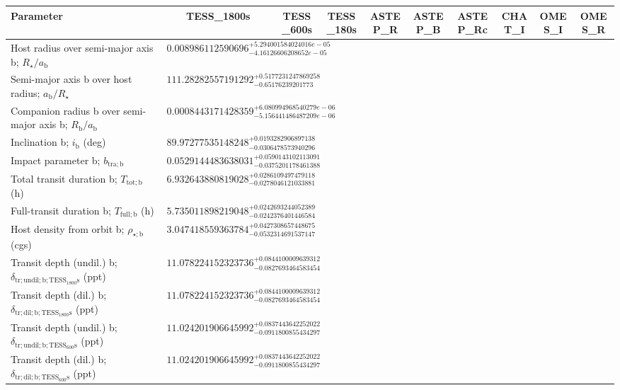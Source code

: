 \begin{table}[h]
\centering
\begin{tabular}{|l|c|c|c|c|c|c|c|c|c|}
\hline
\textbf{Parameter} & \textbf{TESS_1800s} & \textbf{TESS_600s} & \textbf{TESS_180s} & \textbf{ASTEP_R} & \textbf{ASTEP_B} & \textbf{ASTEP_Rc} & \textbf{CHAT_I} & \textbf{OMES_I} & \textbf{OMES_R} \\
\hline
Host radius over semi-major axis b; $R_\star/a_\mathrm{b}$ & \( 0.008986112590696^{+5.294001584024016e-05}_{-4.16126606208652e-05} \) & & & & & & & & \\
Semi-major axis b over host radius; $a_\mathrm{b}/R_\star$ & \( 111.28282557191292^{+0.5177231247869258}_{-0.65176239201773} \) & & & & & & & & \\
Companion radius b over semi-major axis b; $R_\mathrm{b}/a_\mathrm{b}$ & \( 0.0008443171428359^{+6.080994968540279e-06}_{-5.156441486487209e-06} \) & & & & & & & & \\
Inclination b; $i_\mathrm{b}$ (deg) & \( 89.97277535148248^{+0.0193282906897138}_{-0.0306478573940296} \) & & & & & & & & \\
Impact parameter b; $b_\mathrm{tra;b}$ & \( 0.0529144483638031^{+0.0590143102113091}_{-0.0375201178461388} \) & & & & & & & & \\
Total transit duration b; $T_\mathrm{tot;b}$ (h) & \( 6.932643880819028^{+0.0286109497479118}_{-0.0278046121033881} \) & & & & & & & & \\
Full-transit duration b; $T_\mathrm{full;b}$ (h) & \( 5.735011898219048^{+0.0242693244052389}_{-0.0242376401446584} \) & & & & & & & & \\
Host density from orbit b; $\rho_\mathrm{\star;b}$ (cgs) & \( 3.047418559363784^{+0.0427308657448675}_{-0.0532314691537147} \) & & & & & & & & \\
Transit depth (undil.) b; $\delta_\mathrm{tr; undil; b; TESS_1800s}$ (ppt) & \( 11.078224152323736^{+0.0844100009639312}_{-0.0827693464583454} \) & & & & & & & & \\
Transit depth (dil.) b; $\delta_\mathrm{tr; dil; b; TESS_1800s}$ (ppt) & \( 11.078224152323736^{+0.0844100009639312}_{-0.0827693464583454} \) & & & & & & & & \\
Transit depth (undil.) b; $\delta_\mathrm{tr; undil; b; TESS_600s}$ (ppt) & \( 11.024201906645992^{+0.0837443642252022}_{-0.0911800855434297} \) & & & & & & & & \\
Transit depth (dil.) b; $\delta_\mathrm{tr; dil; b; TESS_600s}$ (ppt) & \( 11.024201906645992^{+0.0837443642252022}_{-0.0911800855434297} \) & & & & & & & & \\

\end{tabular}
\end{table}
